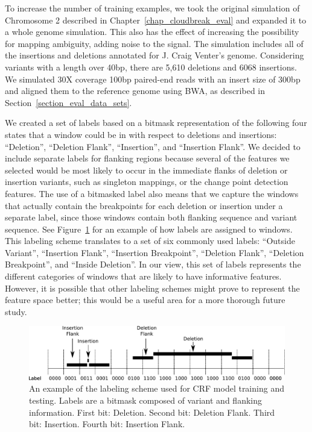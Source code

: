 To increase the number of training examples, we took the original simulation of Chromosome 2 described in Chapter~\ref{chap_cloudbreak_eval} and expanded it to a whole genome simulation. This also has the effect of increasing the possibility for mapping ambiguity, adding noise to the signal. The simulation includes all of the insertions and deletions annotated for J. Craig Venter's genome. Considering variants with a length over 40bp, there are 5,610 deletions and 6068 insertions. We simulated 30X coverage 100bp paired-end reads with an insert size of 300bp and aligned them to the reference genome using BWA, as described in Section~\ref{section_eval_data_sets}. 

We created a set of labels based on a bitmask representation of the following four states that a window could be in with respect to deletions and insertions: ``Deletion'', ``Deletion Flank'', ``Insertion'', and ``Insertion Flank''. We decided to include separate labels for flanking regions because several of the features we selected would be most likely to occur in the immediate flanks of deletion or insertion variants, such as singleton mappings, or the change point detection features. The use of a bitmasked label also means that we capture the windows that actually contain the breakpoints for each deletion or insertion under a separate label, since those windows contain both flanking sequence and variant sequence. See Figure~\ref{crf_labels} for an example of how labels are assigned to windows. This labeling scheme translates to a set of six commonly used labels: ``Outside Variant'', ``Insertion Flank'', ``Insertion Breakpoint'', ``Deletion Flank'', ``Deletion Breakpoint'', and ``Inside Deletion''. In our view, this set of labels represents the different categories of windows that are likely to have informative features. However, it is possible that other labeling schemes might prove to represent the feature space better; this would be a useful area for a more thorough future study.

\begin{figure}
\centering
\includegraphics[width=1\textwidth]{figures/crf_labelling.pdf}
\caption[An example of the labeling scheme used for CRF model training and testing.]{An example of the labeling scheme used for CRF model training and testing. Labels are a bitmask composed of variant and flanking information. First bit: Deletion. Second bit: Deletion Flank. Third bit: Insertion. Fourth bit: Insertion Flank.}
\label{crf_labels}
\end{figure}

